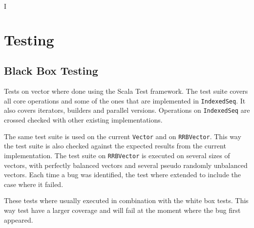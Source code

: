 I%

\chapter{Testing} %

\label{Testing} %



\section{Black Box Testing}
Tests on vector where done using the Scala Test framework. The test suite covers all core operations and some of the ones that are implemented in \texttt{IndexedSeq}. It also covers iterators, builders and parallel versions. Operations on \texttt{IndexedSeq} are crossed checked with other existing implementations.

The same test suite is used on the current \texttt{Vector} and on \texttt{RRBVector}. This way the test suite is also checked against the expected results from the current implementation. The test suite on \texttt{RRBVector} is executed on several sizes of vectors, with perfectly balanced vectors and several pseudo randomly unbalanced vectors. Each time a bug was identified, the test where extended to include the case where it failed.

These tests where usually executed in combination with the white box tests. This way test have a larger coverage and will fail at the moment where the bug first appeared. 

